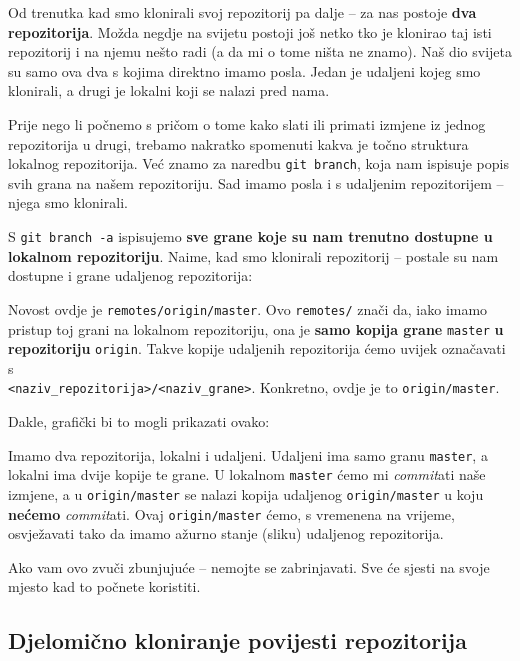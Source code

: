 Od trenutka kad smo klonirali svoj repozitorij pa dalje -- za nas postoje \textbf{dva repozitorija}.
Možda negdje na svijetu postoji još netko tko je klonirao taj isti repozitorij i na njemu nešto radi (a da mi o tome ništa ne znamo).
Naš dio svijeta su samo ova dva s kojima direktno imamo posla. 
Jedan je udaljeni kojeg smo klonirali, a drugi je lokalni koji se nalazi pred nama.

Prije nego li počnemo s pričom o tome kako slati ili primati izmjene iz jednog repozitorija u drugi, trebamo nakratko spomenuti kakva je točno struktura lokalnog repozitorija.
Već znamo za naredbu \verb+git branch+, koja nam ispisuje popis svih grana na našem repozitoriju.
Sad imamo posla i s udaljenim repozitorijem -- njega smo klonirali.

S \verb+git branch -a+ ispisujemo \textbf{sve grane koje su nam trenutno dostupne u lokalnom repozitoriju}.
Naime, kad smo klonirali repozitorij -- postale su nam dostupne i grane udaljenog repozitorija:



Novost ovdje je \verb+remotes/origin/master+.
Ovo \verb+remotes/+ znači da, iako imamo pristup toj grani na lokalnom repozitoriju, ona je \textbf{samo kopija grane} \verb+master+ \textbf{u repozitoriju} \verb+origin+.
Takve kopije udaljenih repozitorija ćemo uvijek označavati s \\ \verb+<naziv_repozitorija>/<naziv_grane>+.
Konkretno, ovdje je to \verb+origin/master+.

Dakle, grafički bi to mogli prikazati ovako:



Imamo dva repozitorija, lokalni i udaljeni.
Udaljeni ima samo granu \verb+master+, a lokalni ima dvije kopije te grane. 
U lokalnom \verb+master+ ćemo mi \emph{commit}ati naše izmjene, a u \verb+origin/master+ se nalazi kopija udaljenog \verb+origin/master+ u koju \textbf{nećemo} \emph{commit}ati.
Ovaj \verb+origin/master+ ćemo, s vremenena na vrijeme, osvježavati tako da imamo ažurno stanje (sliku) udaljenog repozitorija.

Ako vam ovo zvuči zbunjujuće -- nemojte se zabrinjavati.
Sve će sjesti na svoje mjesto kad to počnete koristiti.

\subsection*{Djelomično kloniranje povijesti repozitorija}

